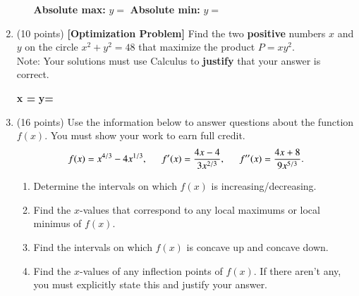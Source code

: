 \documentclass[12pt]{article}
\renewcommand{\emph}[1]{\textsf{\textbf{#1}}}
\begin{document}
\begin{enumerate}
\begin{enumerate}
	\textbf{Absolute max:}  $y=$\hspace{2.5in} \textbf{Absolute min:} $y=$
	\end{enumerate}

\pagebreak



\item (10 points) \textbf{[Optimization Problem]} Find the two \textbf{positive} numbers $x$ and $y$ on the circle $x^2 + y^2 = 48$ that maximize the product $P=xy^2.$ \\
Note: Your solutions must use Calculus to \emph{justify} that your answer is correct.\\
\vfill

\textbf{x =} \hspace{1in} \textbf{y=}

\newpage
\item (16 points) Use the information below to answer questions about the function $f(x).$ You must show your work to earn full credit. \\
$$f(x)=x^{4/3}-4x^{1/3}, \hspace{.2in} f'(x)=\frac{4x-4}{3x^{2/3}},
\hspace{.2in} f''(x)=\frac{4x+8}{9x^{5/3}}.$$

\begin{enumerate}
\item  Determine the intervals on which $f(x)$ is increasing/decreasing.
\vfill
\item Find the $x$-values that correspond to any local maximums or local minimus of $f(x)$. 
\vfill
\item Find the intervals on which $f(x)$ is concave up and concave down.
\vfill 
\item Find the $x$-values of any inflection points of $f(x).$ If there aren't any, you must explicitly state this and justify your answer.
\vfill
\end{enumerate}


\end{enumerate}
\end{document}
